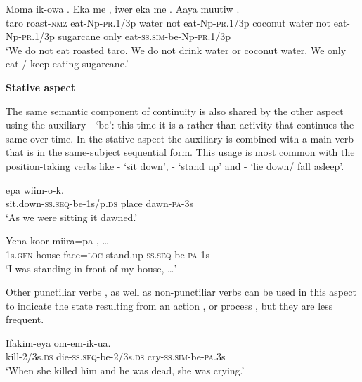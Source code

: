 \ea%
\label{ex:3:x1049}
\gll Moma ik-owa . Eka me , iwer eka me . Aaya muutiw .\\
taro roast-\textsc{nmz} eat-Np-\textsc{pr}.1/3p water not eat-Np-\textsc{pr}.1/3p coconut water not eat-Np-\textsc{pr}.1/3p sugarcane only eat-\textsc{ss}.\textsc{sim}-be-Np-\textsc{pr}.1/3p\\
\glt`We do not eat roasted taro. We do not drink water or coconut water. We only eat / keep eating sugarcane.'
\z

{\bfseries
{}
Stative aspect} \label{sec:3.8.5.1.1.3}

The same semantic component of continuity is also shared by the other aspect using the auxiliary - `be': this time it is a  rather than activity that continues the same over time. In the stative aspect the auxiliary is combined with a main verb that is in the same-subject sequential form. This usage is most common with the position-taking verbs like - `sit down', - `stand up' and - `lie down/ fall asleep'.

\ea%
\label{ex:3:x356}
\gll {}  epa wiim-o-k. \\
sit.down-\textsc{ss}.\textsc{seq}-be-1s/p.\textsc{ds} place dawn-\textsc{pa}-3s \\
\glt`As we were sitting it dawned.'
\z

\ea%
\label{ex:3:x1046}
\gll Yena koor miira=pa , {\dots} \\
1s.\textsc{gen} house face=\textsc{loc} stand.up-\textsc{ss}.\textsc{seq}-be-\textsc{pa}-1s\\
\glt`I was standing in front of my house, {\dots}'
\z

Other punctiliar verbs , as well as non-punctiliar verbs can be used in this aspect to indicate the state resulting from an action , or process , but they are less frequent.

\ea%
\label{ex:3:x357}
\gll Ifakim-eya   om-em-ik-ua. \\
kill-2/3s.\textsc{ds} die-\textsc{ss}.\textsc{seq}-be-2/3s.\textsc{ds} cry-\textsc{ss}.\textsc{sim}-be-\textsc{pa}.3s\\
\glt`When she killed him and he was dead, she was crying.'
\z

